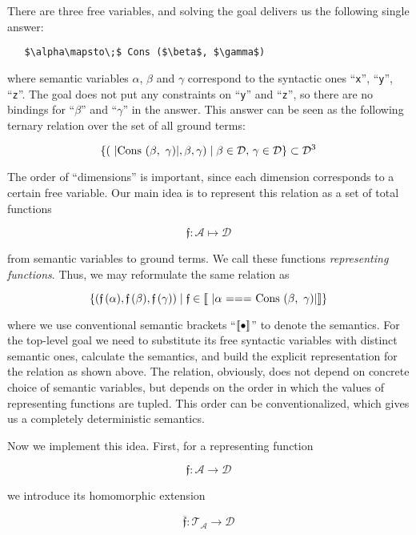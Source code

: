 There are three free variables, and solving the goal delivers us the following single answer:

\begin{lstlisting}
   $\alpha\mapsto\;$ Cons ($\beta$, $\gamma$)
\end{lstlisting}

where semantic variables $\alpha$, $\beta$ and $\gamma$ correspond to the syntactic ones ``\lstinline|x|'', ``\lstinline|y|'', ``\lstinline|z|''. The
goal does not put any constraints on ``\lstinline|y|'' and ``\lstinline|z|'', so there are no bindings for ``$\beta$'' and ``$\gamma$'' in the answer.
This answer can be seen as the following ternary relation over the set of all ground terms:

\[
\{(\mbox{\lstinline|Cons ($\beta$, $\,\gamma$)|}, \beta, \gamma) \mid \beta\in\mathcal{D},\,\gamma\in\mathcal{D}\}\subset\mathcal{D}^3
\]

The order of ``dimensions'' is important, since each dimension corresponds to a certain free variable. Our main idea is to represent this relation as a set of total
functions 

\[
\mathfrak{f}:\mathcal{A}\mapsto\mathcal{D}
\]

from semantic variables to ground terms. We call these functions \emph{representing functions}. Thus, we may reformulate the same relation as

\[
\{(\mathfrak{f}\,(\alpha),\mathfrak{f}\,(\beta),\mathfrak{f}\,(\gamma))\mid\mathfrak{f}\in\sembr{\mbox{\lstinline|$\alpha$ === Cons ($\beta$, $\,\gamma$)|}}\}
\]

where we use conventional semantic brackets ``$\llbracket{\bullet}\rrbracket$'' to denote the semantics. For the top-level goal we need to substitute its free syntactic
variables with distinct semantic ones, calculate the semantics, and build the explicit representation for the relation as shown above. The relation, obviously,
does not depend on concrete choice of semantic variables, but depends on the order in which the values of representing functions are tupled. This order can be
conventionalized, which gives us a completely deterministic semantics.

Now we implement this idea. First, for a representing function

\[
\mathfrak{f} : \mathcal{A}\to\mathcal{D}
\]

we introduce its homomorphic extension 

\[
  \overline{\mathfrak{f}}:\mathcal{T_A}\to\mathcal{D}
\]

